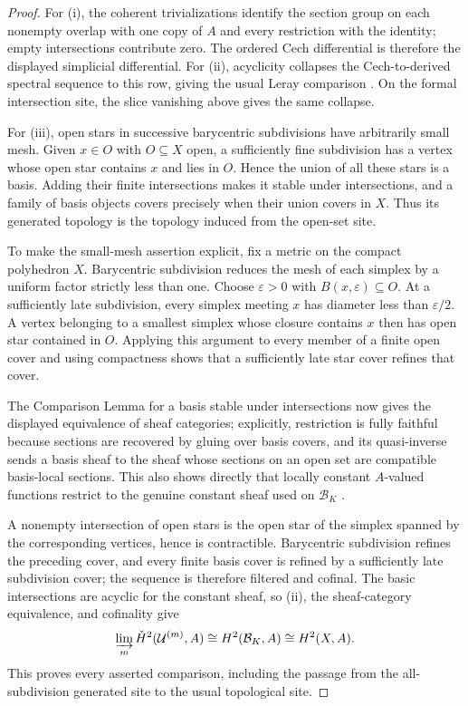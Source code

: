 \begin{proof}
For (i), the coherent trivializations identify the section group on each
nonempty overlap with one copy of \(A\) and every restriction with the
identity; empty intersections contribute zero.  The ordered Cech differential
is therefore the displayed simplicial differential.  For (ii), acyclicity
collapses the Cech-to-derived spectral sequence to this row, giving the usual
Leray comparison \cite[Chap.~III, Sec.~4]{Bredon1997}.  On the formal
intersection site, the slice vanishing above gives the same collapse.

For (iii), open stars in successive barycentric subdivisions have arbitrarily
small mesh.  Given \(x\in O\) with \(O\subseteq X\) open, a sufficiently
fine subdivision has a vertex whose open star contains \(x\) and lies in
\(O\).  Hence the union of all these stars is a basis.  Adding their finite
intersections makes it stable under intersections, and a family of basis
objects covers precisely when their union covers in \(X\).  Thus its
generated topology is the topology induced from the open-set site.

To make the small-mesh assertion explicit, fix a metric on the compact
polyhedron \(X\).  Barycentric subdivision reduces the mesh of each simplex
by a uniform factor strictly less than one.  Choose
\(\varepsilon>0\) with \(B(x,\varepsilon)\subseteq O\).  At a sufficiently
late subdivision, every simplex meeting \(x\) has diameter less than
\(\varepsilon/2\).  A vertex belonging to a smallest simplex whose closure
contains \(x\) then has open star contained in \(O\).  Applying this
argument to every member of a finite open cover and using compactness shows
that a sufficiently late star cover refines that cover.

The Comparison Lemma for a basis stable under intersections now gives the
displayed equivalence of sheaf categories; explicitly, restriction is fully
faithful because sections are recovered by gluing over basis covers, and its
quasi-inverse sends a basis sheaf to the sheaf whose sections on an open set
are compatible basis-local sections.  This also shows directly that locally
constant \(A\)-valued functions restrict to the genuine constant sheaf used
on \(\mathcal B_K\) \cite[Chap.~III, Sec.~7]{MacLaneMoerdijk1994}.

A nonempty intersection of open stars is the open star of the simplex spanned
by the corresponding vertices, hence is contractible.  Barycentric
subdivision refines the preceding cover, and every finite basis cover is
refined by a sufficiently late subdivision cover; the sequence is therefore
filtered and cofinal.  The basic intersections are acyclic for the constant
sheaf, so (ii), the sheaf-category equivalence, and cofinality give
\[
 \varinjlim_m\check H^2(\mathcal U^{(m)},A)
 \cong H^2(\mathcal B_K,A)
 \cong H^2(X,A).
\]
This proves every asserted comparison, including the passage from the
all-subdivision generated site to the usual topological site.
\end{proof}

